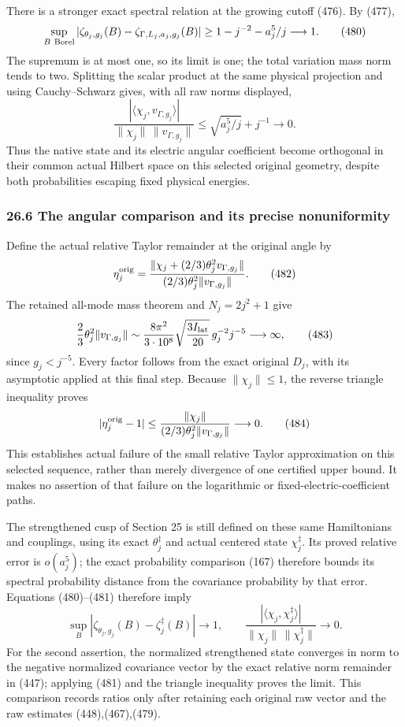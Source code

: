 \documentclass[
  11pt,
]{article}
\begin{document}
There is a stronger exact spectral relation at the growing cutoff (476).
By (477), \[
 \sup_{B\ {\rm Borel}}|\zeta_{\theta_j,g_j}(B)
                  -\zeta_{\Gamma,L_j,a_j,g_j}(B)|
       \ge1-j^{-2}-a_j^5/j\longrightarrow1 .
 \tag{480}
\] The supremum is at most one, so its limit is one; the total variation
mass norm tends to two. Splitting the scalar product at the same
physical projection and using Cauchy--Schwarz gives, with all raw norms
displayed, \[
 \frac{|\langle\chi_j,v_{\Gamma,g_j}\rangle|}
           {\|\chi_j\|\,\|v_{\Gamma,g_j}\|}
       \le\sqrt{a_j^5/j}+j^{-1}\longrightarrow0 .
 \tag{481}
\] Thus the native state and its electric angular coefficient become
orthogonal in their common actual Hilbert space on this selected
original geometry, despite both probabilities escaping fixed physical
energies.

\subsubsection{26.6 The angular comparison and its precise
nonuniformity}\label{the-angular-comparison-and-its-precise-nonuniformity}

Define the actual relative Taylor remainder at the original angle by \[
 \eta_j^{\rm orig}
  =\frac{\|\chi_j+(2/3)\theta_j^2v_{\Gamma,g_j}\|}
          {(2/3)\theta_j^2\|v_{\Gamma,g_j}\|}.
 \tag{482}
\] The retained all-mode mass theorem and \(N_j=2j^2+1\) give \[
 \frac23\theta_j^2\|v_{\Gamma,g_j}\|
 \sim
 \frac{8\pi^2}{3\cdot10^8}
       \sqrt{\frac{3I_{\rm lat}}{20}}\,
               g_j^{-2}j^{-5}\longrightarrow\infty,
 \tag{483}
\] since \(g_j<j^{-5}\). Every factor follows from the exact original
\(D_j\), with its asymptotic applied at this final step. Because
\(\|\chi_j\|\le1\), the reverse triangle inequality proves \[
 |\eta_j^{\rm orig}-1|
       \le\frac{\|\chi_j\|}
                 {(2/3)\theta_j^2\|v_{\Gamma,g_j}\|}
           \longrightarrow0 .
 \tag{484}
\] This establishes actual failure of the small relative Taylor
approximation on this selected sequence, rather than merely divergence
of one certified upper bound. It makes no assertion of that failure on
the logarithmic or fixed-electric-coefficient paths.

The strengthened cusp of Section 25 is still defined on these same
Hamiltonians and couplings, using its exact \(\theta_j^\ddagger\) and
actual centered state \(\chi_j^\ddagger\). Its proved relative error is
\(o(a_j^5)\); the exact probability comparison (167) therefore bounds
its spectral probability distance from the covariance probability by
that error. Equations (480)--(481) therefore imply \[
 \sup_B|\zeta_{\theta_j,g_j}(B)-\zeta_j^\ddagger(B)|
       \longrightarrow1,\qquad
 \frac{|\langle\chi_j,\chi_j^\ddagger\rangle|}
                 {\|\chi_j\|\,\|\chi_j^\ddagger\|}
       \longrightarrow0 .
 \tag{485}
\] For the second assertion, the normalized strengthened state converges
in norm to the negative normalized covariance vector by the exact
relative norm remainder in (447); applying (481) and the triangle
inequality proves the limit. This comparison records ratios only after
retaining each original raw vector and the raw estimates
(448),(467),(479).
\end{document}

